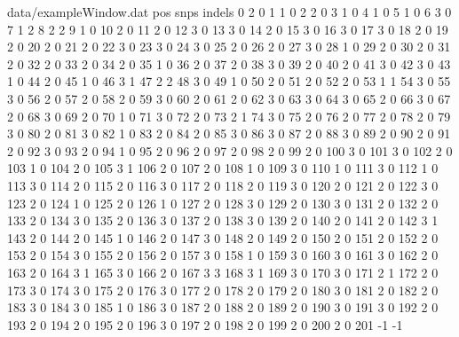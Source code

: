 \begin{filecontents}{data/exampleWindow.dat}
pos	snps	indels
0	2	0
1	1	0
2	2	0
3	1	0
4	1	0
5	1	0
6	3	0
7	1	2
8	2	2
9	1	0
10	2	0
11	2	0
12	3	0
13	3	0
14	2	0
15	3	0
16	3	0
17	3	0
18	2	0
19	2	0
20	2	0
21	2	0
22	3	0
23	3	0
24	3	0
25	2	0
26	2	0
27	3	0
28	1	0
29	2	0
30	2	0
31	2	0
32	2	0
33	2	0
34	2	0
35	1	0
36	2	0
37	2	0
38	3	0
39	2	0
40	2	0
41	3	0
42	3	0
43	1	0
44	2	0
45	1	0
46	3	1
47	2	2
48	3	0
49	1	0
50	2	0
51	2	0
52	2	0
53	1	1
54	3	0
55	3	0
56	2	0
57	2	0
58	2	0
59	3	0
60	2	0
61	2	0
62	3	0
63	3	0
64	3	0
65	2	0
66	3	0
67	2	0
68	3	0
69	2	0
70	1	0
71	3	0
72	2	0
73	2	1
74	3	0
75	2	0
76	2	0
77	2	0
78	2	0
79	3	0
80	2	0
81	3	0
82	1	0
83	2	0
84	2	0
85	3	0
86	3	0
87	2	0
88	3	0
89	2	0
90	2	0
91	2	0
92	3	0
93	2	0
94	1	0
95	2	0
96	2	0
97	2	0
98	2	0
99	2	0
100	3	0
101	3	0
102	2	0
103	1	0
104	2	0
105	3	1
106	2	0
107	2	0
108	1	0
109	3	0
110	1	0
111	3	0
112	1	0
113	3	0
114	2	0
115	2	0
116	3	0
117	2	0
118	2	0
119	3	0
120	2	0
121	2	0
122	3	0
123	2	0
124	1	0
125	2	0
126	1	0
127	2	0
128	3	0
129	2	0
130	3	0
131	2	0
132	2	0
133	2	0
134	3	0
135	2	0
136	3	0
137	2	0
138	3	0
139	2	0
140	2	0
141	2	0
142	3	1
143	2	0
144	2	0
145	1	0
146	2	0
147	3	0
148	2	0
149	2	0
150	2	0
151	2	0
152	2	0
153	2	0
154	3	0
155	2	0
156	2	0
157	3	0
158	1	0
159	3	0
160	3	0
161	3	0
162	2	0
163	2	0
164	3	1
165	3	0
166	2	0
167	3	3
168	3	1
169	3	0
170	3	0
171	2	1
172	2	0
173	3	0
174	3	0
175	2	0
176	3	0
177	2	0
178	2	0
179	2	0
180	3	0
181	2	0
182	2	0
183	3	0
184	3	0
185	1	0
186	3	0
187	2	0
188	2	0
189	2	0
190	3	0
191	3	0
192	2	0
193	2	0
194	2	0
195	2	0
196	3	0
197	2	0
198	2	0
199	2	0
200	2	0
201	-1	-1
\end{filecontents}